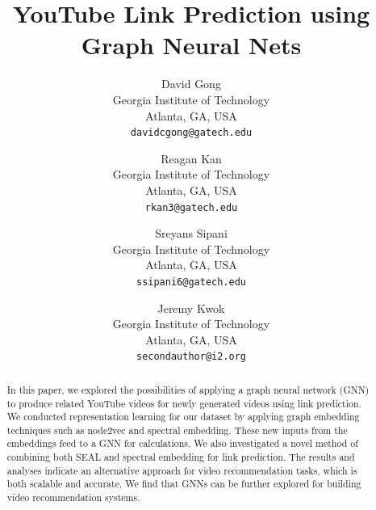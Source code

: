 \documentclass[10pt,twocolumn,letterpaper]{article}
\begin{document}
\title{YouTube Link Prediction using Graph Neural Nets}

\author{David Gong\\
Georgia Institute of Technology\\
Atlanta, GA, USA\\
{\tt\small davidcgong@gatech.edu}
\and
Reagan Kan\\
Georgia Institute of Technology\\
Atlanta, GA, USA\\
{\tt\small rkan3@gatech.edu}
\and
Sreyans Sipani\\
Georgia Institute of Technology\\
Atlanta, GA, USA\\
{\tt\small ssipani6@gatech.edu}
\and
Jeremy Kwok\\
Georgia Institute of Technology\\
Atlanta, GA, USA\\
{\tt\small secondauthor@i2.org}

}

\maketitle

\begin{abstract}
    In this paper, we explored the possibilities of applying a graph neural network (GNN) to produce related YouTube videos for newly generated videos using link prediction. We conducted representation learning for our dataset by applying graph embedding techniques such as node2vec and spectral embedding. These new inputs from the embeddings feed to a GNN for calculations. We also investigated a novel method of combining both SEAL and spectral embedding for link prediction. The results and analyses indicate an alternative approach for video recommendation tasks, which is both scalable and accurate. We find that GNNs can be further explored for building video recommendation systems.
\end{abstract}
\end{document}
